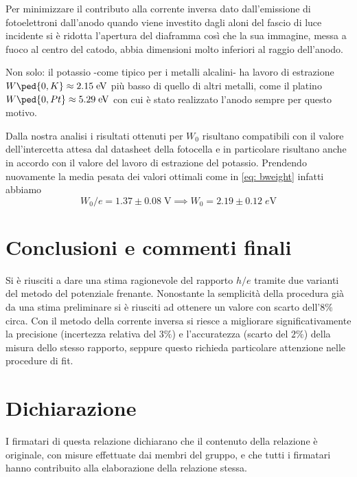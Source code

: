 \documentclass[10pt, a4paper, italian]{article}
\begin{document}
Per minimizzare il contributo alla corrente inversa dato dall'emissione di
fotoelettroni dall'anodo quando viene investito dagli aloni del fascio di
luce incidente si è ridotta l'apertura del diaframma così che la sua
immagine, messa a fuoco al centro del catodo, abbia dimensioni molto
inferiori al raggio dell'anodo.

Non solo: il potassio -come tipico per i metalli alcalini- ha lavoro di
estrazione $W\ped{0, K} \approx 2.15 \; \si{e\V}$ più basso di quello di altri
metalli, come il platino $W\ped{0, Pt} \approx 5.29 \; \si{e\V}$ con cui è
stato realizzato l'anodo sempre per questo motivo.

Dalla nostra analisi i risultati ottenuti per $W_0$ risultano compatibili con
il valore dell'intercetta attesa dal datasheet della fotocella e in
particolare risultano anche in accordo con il valore del lavoro di estrazione
del potassio. Prendendo nuovamente la media pesata dei valori ottimali come in
\cref{eq: bweight} infatti abbiamo
\[
W_0/e = 1.37 \pm 0.08 \; \si{\V} \implies W_0 = 2.19 \pm 0.12 \; \si{e\V}
\]

\section*{Conclusioni e commenti finali}
Si è riusciti a dare una stima ragionevole del rapporto $h/e$ tramite due
varianti del metodo del potenziale frenante. Nonostante la semplicità della
procedura già da una stima preliminare si è riusciti ad ottenere un valore
con scarto dell'$8 \%$ circa. Con il metodo della corrente inversa si riesce
a migliorare significativamente la precisione (incertezza relativa del $3 \%$)
e l'accuratezza (scarto del $2 \%$) della misura dello stesso rapporto,
seppure questo richieda particolare attenzione nelle procedure di fit.

\section*{Dichiarazione}
I firmatari di questa relazione dichiarano che il contenuto della relazione \`e
originale, con misure effettuate dai membri del gruppo, e che tutti i firmatari
hanno contribuito alla elaborazione della relazione stessa.
\end{document}
